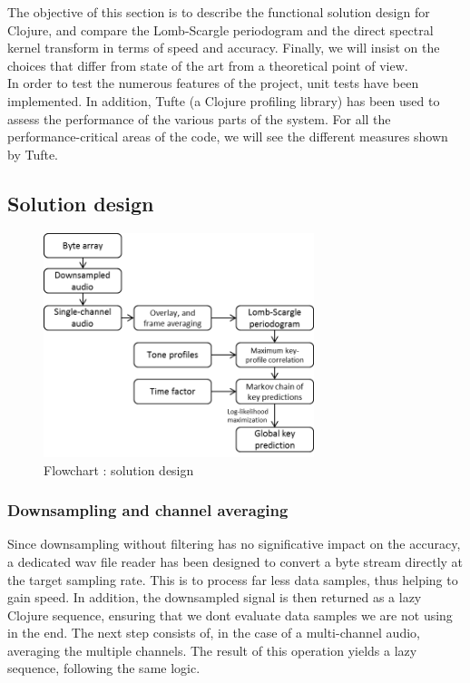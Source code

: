 \documentclass[letterpaper]{article}
\begin{document}
The objective of this section is to describe the functional solution design for Clojure, and compare the Lomb-Scargle periodogram and the direct spectral kernel
transform in terms of speed and accuracy. Finally, we will insist on the choices that differ from state of the art from a theoretical point of view.\\

In order to test the numerous features of the project, unit tests have been implemented. In addition, Tufte (a Clojure profiling library) has been used to assess the performance of the various parts of the system. For all the performance-critical areas of the code, we will see the different measures shown by Tufte.\\

\subsection{Solution design}

\begin{figure}[h!]
\begin{center}
\includegraphics[width=3.1in,angle=0]{imgs/flowChart.png}
\caption{Flowchart : solution design}
\label{fig3}
\end{center}
\end{figure}

\subsubsection{Downsampling and channel averaging}

Since downsampling without filtering has no significative impact on the accuracy, a dedicated wav file reader has been designed to convert a byte stream directly
at the target sampling rate. This is to process far less data samples, thus helping to gain speed. In addition, the downsampled signal is then returned as
a lazy Clojure sequence, ensuring that we don\textquotesingle t evaluate data samples we are not using in the end.
The next step consists of, in the case of a multi-channel audio, averaging the multiple channels. The result of this operation yields a lazy sequence, following
the same logic.
\end{document}
